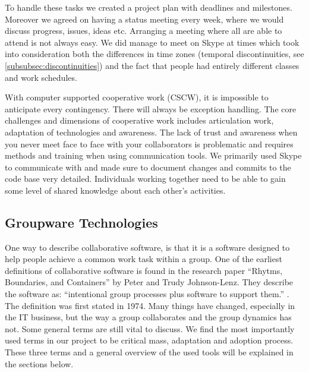 To handle these tasks we created a project plan with deadlines and milestones. 
Moreover we agreed on having a status meeting every week, where we would discuss progress, issues, ideas etc. Arranging a meeting where all are able to attend is not always easy. We did manage to meet on Skype at times which took into consideration both the differences in time zones (temporal discontinuities, see \ref{subsubsec:discontinuities}) and the fact that people had entirely different classes and work schedules.

With computer supported cooperative work (CSCW), it is impossible to anticipate every contingency. There will always be exception handling. The core challenges and dimensions of cooperative work includes articulation work, adaptation of technologies and awareness. The lack of trust and awareness when you never meet face to face with your collaborators is problematic and requires methods and training when using communication tools. We primarily used Skype to communicate with and made sure to document changes and commits to the code base very detailed. Individuals working together need to be able to gain some level of shared knowledge about each other's activities.


\subsection{Groupware Technologies} \label{subsec:groupwaretechnologies}
One way to describe collaborative software, is that it is a software designed to help people achieve a common work task within a group. One of the earliest definitions of collaborative software is found in the research paper ``Rhytms, Boundaries, and Containers'' by Peter and Trudy Johnson-Lenz. They describe the software as: ``intentional group processes plus software to support them.'' \cite{johnson1991post}. The definition was first stated in 1974. Many things have changed, especially in the IT business, but the way a group collaborates and the group dynamics has not. Some general terms are still vital to discuss. We find the most importantly used terms in our project to be critical mass, adaptation and adoption process. These three terms and a general overview of the used tools will be explained in the sections below.

